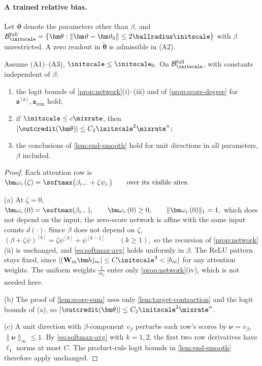 \paragraph{A trained relative bias.} Let $\bm\vartheta$ denote the parameters other than $\beta$, and
$\mathcal B^{\mathrm{full}}_{\initscale}=\{\bm\theta:\|\bm\vartheta-\bm\vartheta_0\|\le2\ballradius\initscale\}$ with $\beta$ unrestricted. A zero readout in $\tilde{\bm\theta}$ is admissible in (A2).

\begin{lemma}
\label{lem:bias-uniform}
Assume (A1)--(A3), $\initscale\le\initscale_0$. On $\mathcal B^{\mathrm{full}}_{\initscale}$, with constants independent of $\beta$:
\begin{enumerate}[label=(\alph*),leftmargin=*,itemsep=3pt,topsep=4pt]
\item the logit bounds of \cref{prop:network}(i)--(iii) and of \cref{prop:score-degree} for $\bm z^{[k]},\bm z_{\mathrm{rem}}$ hold;
\item if $\initscale\le c\mixrate$, then $|\outcredit(\bm\theta)|\le C_2\initscale^2\mixrate^n$;
\item the conclusions of \cref{lem:end-smooth} hold for unit directions in all parameters, $\beta$ included.
\end{enumerate}
\end{lemma}

\begin{proof}
Each attention row is
 $\bm\omega_{i\cdot}(\zeta)=\softmax\bigl(\beta_{i-\cdot}+\zeta\psi_{i\cdot}\bigr)\qquad\text{over its visible sites.}$ 

\noindent(a) At $\zeta=0$,
 $\bm\omega_{i\cdot}(0)=\softmax(\beta_{i-\cdot}),\qquad \bm\omega_{i\cdot}(0)\ge0,\qquad \|\bm\omega_{i\cdot}(0)\|_1=1,$ 
which does not depend on the input; the zero-score network is affine with the same input counts $d(\cdot)$. Since $\beta$ does not
depend on $\zeta$,
 $(\beta+\zeta\psi)^{[k]}=\zeta\psi^{[k]}+\psi^{[k-1]}\qquad(k\ge1),$ 
so the recursion of \cref{prop:network}(ii) is unchanged, and \cref{eq:softmax-avg} holds uniformly in $\beta$. The ReLU pattern stays
fixed, since $|(\mathbf W_{\mathrm{in}}\bm h)_m|\le C\initscale^2<|b_m|$ for any attention weights. The uniform weights $\frac{1}{m_j}$ enter only
\cref{prop:network}(iv), which is not needed here.

\smallskip\noindent(b) The proof of \cref{lem:score-sum} uses only \cref{lem:target-contraction} and the logit bounds of (a), so
$|\outcredit(\bm\theta)|\le C_2\initscale^2\mixrate^n$.

\smallskip\noindent(c) A unit direction with $\beta$-component $v_\beta$ perturbs each row's scores by $\bm\nu=v_\beta$, $\|\bm\nu\|_\infty\le1$. By
\cref{eq:softmax-avg} with $k=1,2$, the first two row derivatives have $\ell_1$ norms at most $C$. The product-rule logit bounds in \cref{lem:end-smooth} therefore apply unchanged.
\end{proof}

